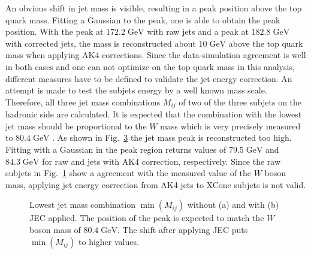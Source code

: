  	An obvious shift in jet mass is visible, resulting in a peak position above the top quark mass. Fitting a Gaussian to the peak, one is able to obtain the peak position. With the peak at $172.2\;\text{GeV}$ with raw jets and a peak at $182.8\;\text{GeV}$ with corrected jets, the mass is reconstructed about $10\;\text{GeV}$ above the top quark mass when applying AK4 corrections. Since the data-simulation agreement is well in both cases and one can not optimize on the top quark mass in this analysis, different measures have to be defined to validate the jet energy correction. An attempt is made to test the subjets energy by a well known mass scale. Therefore, all three jet mass combinations $M_{ij}$ of two of the three subjets on the hadronic side are calculated. It is expected that the combination with the lowest jet mass should be proportional to the $W$ mass which is very precisely measured to $80.4\;\text{GeV}$ \cite{Wmass}. As shown in Fig.~\ref{fig:Wmass} the jet mass peak is reconstructed too high. Fitting with a Gaussian in the peak region returns values of $79.5\;\text{GeV}$ and $84.3\;\text{GeV}$ for raw and jets with AK4 correction, respectively. Since the raw subjets in Fig.~\ref{fig:Wmass1} show a agreement with the measured value of the $W$ boson mass, applying jet energy correction from AK4 jets to XCone subjets is not valid.
  	\begin{figure}[tb]
  		\begin{subfigure}{.5\textwidth}
  		\centering
  		\caption{}
  		\label{fig:Wmass1}
  		\end{subfigure}
  		\begin{subfigure}{.5\textwidth}
  		\centering
  		\caption{}
  		\label{fig:Wmass2}
  		\end{subfigure}
  		\caption{Lowest jet mass combination $\min(M_{ij})$ without (a) and with (b) JEC applied. The position of the peak is expected to match the $W$ boson mass of $80.4\;\text{GeV}$. The shift after applying JEC puts $\min(M_{ij})$ to higher values.} 
  		\label{fig:Wmass}
  	\end{figure}	

